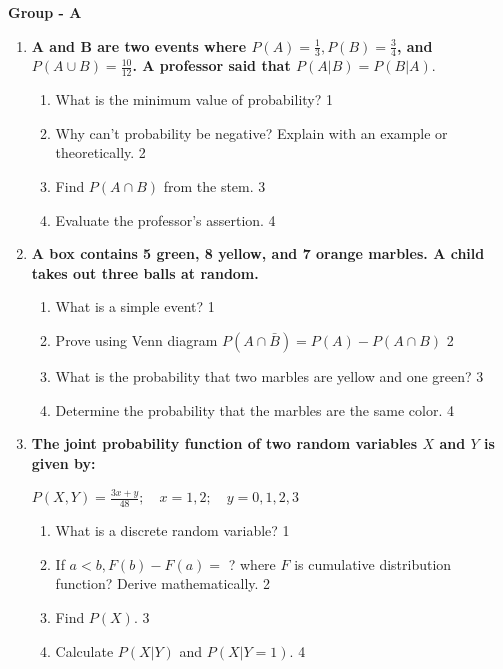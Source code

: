 \documentclass[12pt]{article}
\begin{document}
\begin{center}
\textbf{Group  - A}
\end{center}
\begin{enumerate}

  \item
	  \textbf{A and B are two events where $P(A) = \frac 13, P(B) = \frac 34$, and $P(A\cup B) = \frac{10}{12}$. A professor said that $P(A|B) = P(B|A)$}. 
  
  \begin{enumerate}
    \item
	What is the minimum value of probability? \hfill 1
    \item
	Why can't probability be negative? Explain with an example or theoretically. \hfill 2
    \item  
	Find $P(A \cap B)$ from the stem. \hfill 3
    \item
	Evaluate the professor's assertion. \hfill 4
  \end{enumerate}
  
     \item
	  \textbf{A box contains 5 green, 8 yellow, and 7 orange marbles. A child takes out three balls at random.} 
  
  \begin{enumerate}
  
    \item What is a simple event? \hfill 1
    \item Prove using Venn diagram $P(A\cap \bar B) = P(A) - P(A\cap B)$ \hfill 2
    \item  
	What is the probability that two marbles are yellow and one green? \hfill 3
    \item
	Determine the probability that the marbles are the same color. \hfill 4
  \end{enumerate}

 
  \item
  \textbf{The joint probability function of two random variables \( X \) and \( Y \) is given by:}
  
  \begin{center}
  \( \displaystyle P(X,Y) = \frac{3x + y}{48}; \quad x = 1, 2; \quad y = 0, 1, 2, 3 \)
  \end{center}
 
  \begin{enumerate}
    \item What is a discrete random variable? \hfill 1
    \item If $a<b, F(b) - F(a) =$ ? where $F$ is cumulative distribution function? Derive mathematically. \hfill 2
    \item
    	Find \( P(X) \). \hfill 3
    \item
     	Calculate \( P(X \vert Y) \) and \( P(X \vert Y=1) \). \hfill 4
  \end{enumerate}
  

\end{enumerate}
\end{document}
